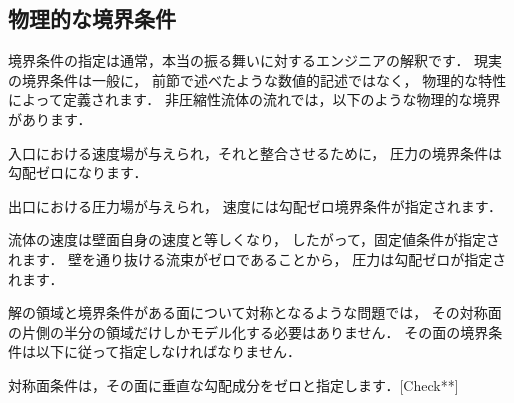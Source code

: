 \subsection{物理的な境界条件}
\label{ssec:2.6.1}
境界条件の指定は通常，本当の振る舞いに対するエンジニアの解釈です．
現実の境界条件は一般に，
前節で述べたような数値的記述ではなく，
%
物理的な特性によって定義されます．
非圧縮性流体の流れでは，以下のような物理的な境界があります．
\begin{description}
%
%
 \item[入口] 入口における速度場が与えられ，それと整合させるために，
            圧力の境界条件は勾配ゼロになります．
%
%
 \item[出口] 出口における圧力場が与えられ，
            速度には勾配ゼロ境界条件が指定されます．
%
%
 \item[滑りなし不浸透性壁面] 流体の速度は壁面自身の速度と等しくなり，
            したがって，固定値条件が指定されます．
            壁を通り抜ける流束がゼロであることから，
            圧力は勾配ゼロが指定されます．
\end{description}

解の領域と境界条件がある面について対称となるような問題では，
その対称面の片側の半分の領域だけしかモデル化する必要はありません．
その面の境界条件は以下に従って指定しなければなりません．
\begin{description}
%
%
 \item[対称面] 対称面条件は，その面に垂直な勾配成分をゼロと指定します．[Check**]
\end{description}
